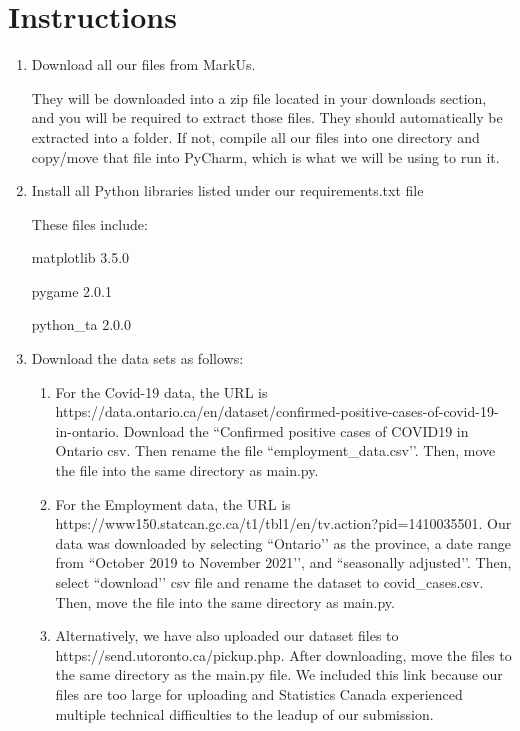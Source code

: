 \documentclass[fontsize=11pt]{article}
\begin{document}
\section{Instructions}
\begin{enumerate}

\item Download all our files from MarkUs.

They will be downloaded into a zip file located in your downloads section, and you will be required to extract those files. They should automatically be extracted into a folder. If not, compile all our files into one directory and copy/move that file into PyCharm, which is what we will be using to run it.

\item Install all Python libraries listed under our requirements.txt file

These files include:

matplotlib 3.5.0

pygame 2.0.1

python\_ta 2.0.0

\item Download the data sets as follows:

\begin{enumerate}

\item For the Covid-19 data, the URL is https://data.ontario.ca/en/dataset/confirmed-positive-cases-of-covid-19-in-ontario. Download the ``Confirmed positive cases of COVID19 in Ontario csv. Then rename the file ``employment\_data.csv’’. Then, move the file into the same directory as main.py.

\item For the Employment data, the URL is https://www150.statcan.gc.ca/t1/tbl1/en/tv.action?pid=1410035501. Our data was downloaded by selecting ``Ontario’’ as the province, a date range from ``October 2019 to November 2021’’, and ``seasonally adjusted’’. Then, select ``download’’ csv file and rename the dataset to covid\_cases.csv. Then, move the file into the same directory as main.py.

\item Alternatively, we have also uploaded our dataset files to https://send.utoronto.ca/pickup.php. After downloading, move the files to the same directory as the main.py file. We included this link because our files are too large for uploading and Statistics Canada experienced multiple technical difficulties to the leadup of our submission.


\end{enumerate}
\end{enumerate}
\end{document}

